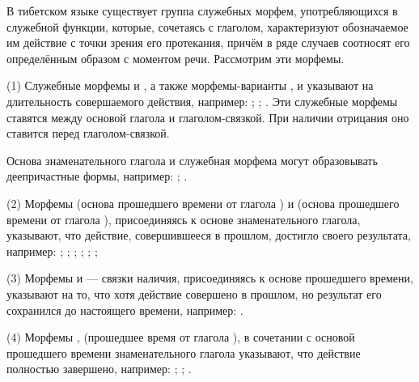 В тибетском языке существует группа служебных морфем, употребляющихся в служебной функции, которые, сочетаясь с глаголом, характеризуют обозначаемое им действие с точки зрения его протекания, причём в ряде случаев соотносят его определённым образом с моментом речи. Рассмотрим эти морфемы.

(1)	Служебные морфемы  и , а также морфемы-варианты ,  и  указывают на длительность совершаемого действия, например:
;
;
.
Эти служебные морфемы ставятся между основой глагола и глаголом-связкой. При наличии отрицания оно ставится перед глаголом-связкой.

Основа знаменательного глагола и служебная морфема  могут образовывать деепричастные формы, например:
;
.

(2)	Морфемы  (основа прошедшего времени от глагола ) и  (основа прошедшего времени от глагола ), присоединяясь к основе знаменательного глагола, указывают, что действие, совершившееся в прошлом, достигло своего результата, например:
;
;
;
;
;
;

(3)	Морфемы	 и	 --- связки наличия, присоединяясь к основе прошедшего времени, указывают на то, что хотя действие совершено в прошлом, но результат его сохранился до настоящего времени, например:
.

(4)	Морфемы ,  (прошедшее время от глагола ),  в сочетании с основой прошедшего времени знаменательного глагола указывают, что действие полностью завершено, например:
;
;
.

